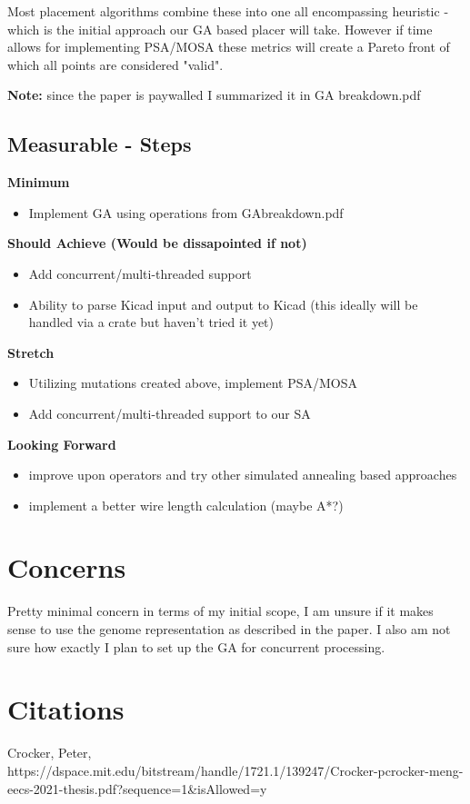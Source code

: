 \documentclass{article}
\begin{document}
Most placement algorithms combine these into one all encompassing heuristic - which is the initial approach our GA based placer will take. However if time allows for implementing PSA/MOSA these metrics will create a Pareto front of which all points are considered "valid". 

\textbf{Note:} since the paper is paywalled I summarized it in GA breakdown.pdf
\subsection{Measurable - Steps }

\noindent\textbf{Minimum}
\begin{itemize}
    \item Implement GA using operations from GA\textunderscore breakdown.pdf  
\end{itemize}


\noindent\textbf{Should Achieve (Would be dissapointed if not)}
\begin{itemize}
    \item Add concurrent/multi-threaded support
    \item Ability to parse Kicad input and output to Kicad (this ideally will be handled via a crate but haven't tried it yet)
\end{itemize}


\noindent\textbf{Stretch}
\begin{itemize}
    \item Utilizing mutations created above, implement PSA/MOSA 
    \item Add concurrent/multi-threaded support to our SA 
\end{itemize}

\noindent\textbf{Looking Forward}
\begin{itemize}
    \item improve upon operators and try other simulated annealing based approaches
    \item implement a better wire length calculation (maybe A*?)
\end{itemize}

\section{Concerns}
Pretty minimal concern in terms of my initial scope, I am unsure if it makes sense to use the genome representation as described in the paper. I also am not sure how exactly I plan to set up the GA for concurrent processing. 
\pagebreak
\section{Citations}

Crocker, Peter, https://dspace.mit.edu/bitstream/handle/1721.1/139247/Crocker-pcrocker-meng-eecs-2021-thesis.pdf?sequence=1&isAllowed=y 
\end{document}

